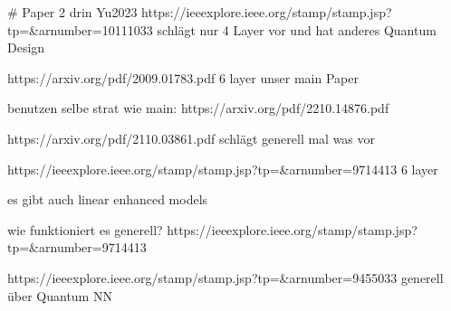 

# Paper 2 drin Yu2023
https://ieeexplore.ieee.org/stamp/stamp.jsp?tp=&arnumber=10111033
schlägt nur 4 Layer vor und hat anderes Quantum Design



https://arxiv.org/pdf/2009.01783.pdf
6 layer unser main Paper

benutzen selbe strat wie main: https://arxiv.org/pdf/2210.14876.pdf



https://arxiv.org/pdf/2110.03861.pdf
schlägt generell mal was vor


https://ieeexplore.ieee.org/stamp/stamp.jsp?tp=&arnumber=9714413
6 layer 



es gibt auch linear enhanced models 

wie funktioniert es generell?
https://ieeexplore.ieee.org/stamp/stamp.jsp?tp=&arnumber=9714413


https://ieeexplore.ieee.org/stamp/stamp.jsp?tp=&arnumber=9455033
generell über Quantum NN
